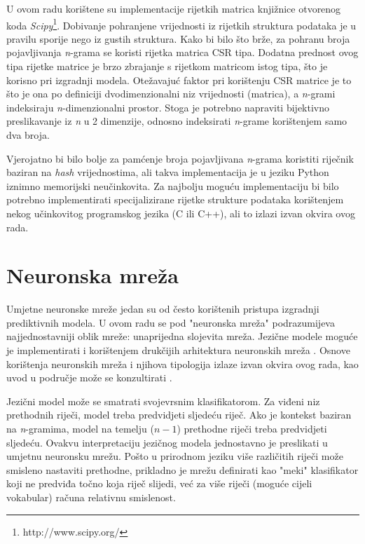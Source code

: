 \documentclass[times, utf8, diplomski, numeric]{fer}
\begin{document}
U ovom radu korištene su implementacije rijetkih matrica knjižnice otvorenog koda \textit{Scipy}\footnote{http://www.scipy.org/}. Dobivanje pohranjene vrijednosti iz rijetkih struktura podataka je u pravilu sporije nego iz gustih struktura. Kako bi bilo što brže, za pohranu broja pojavljivanja \textit{n}-grama se koristi rijetka matrica CSR  tipa. Dodatna prednost ovog tipa rijetke matrice je brzo zbrajanje s rijetkom matricom istog tipa, što je korisno pri izgradnji modela. Otežavajuć faktor pri korištenju CSR matrice je to što je ona po definiciji dvodimenzionalni niz vrijednosti (matrica), a \textit{n}-grami indeksiraju \textit{n}-dimenzionalni prostor. Stoga je potrebno napraviti bijektivno preslikavanje iz \textit{n} u 2 dimenzije, odnosno indeksirati \textit{n}-grame korištenjem samo dva broja.

Vjerojatno bi bilo bolje za pamćenje broja pojavljivana \textit{n}-grama koristiti riječnik baziran na \textit{hash} vrijednostima, ali takva implementacija je u jeziku Python iznimno memorijski neučinkovita. Za najbolju moguću implementaciju bi bilo potrebno implementirati specijalizirane rijetke strukture podataka korištenjem nekog učinkovitog programskog jezika (C ili C++), ali to izlazi izvan okvira ovog rada.

\chapter{Neuronska mreža}
\label{sec:nnet}

Umjetne neuronske mreže jedan su od često korištenih pristupa izgradnji prediktivnih modela. U ovom radu se pod "neuronska mreža" podrazumijeva najjednostavniji oblik mreže: unaprijedna slojevita mreža. Jezične modele moguće je implementirati i korištenjem drukčijih arhitektura neuronskih mreža \cite{mikolov2012statistical}. Osnove korištenja neuronskih mreža i njihova tipologija izlaze izvan okvira ovog rada, kao uvod u područje može se konzultirati \cite{cupic2013}.

Jezični model može se smatrati svojevrsnim klasifikatorom. Za viđeni niz prethodnih riječi, model treba predvidjeti sljedeću riječ. Ako je kontekst baziran na \textit{n}-gramima, model na temelju ($n - 1$) prethodne riječi treba predvidjeti sljedeću. Ovakvu interpretaciju jezičnog modela jednostavno je preslikati u umjetnu neuronsku mrežu. Pošto u prirodnom jeziku više različitih riječi može smisleno nastaviti prethodne, prikladno je mrežu definirati kao "meki" klasifikator koji ne predviđa točno koja riječ slijedi, već za više riječi (moguće cijeli vokabular) računa relativnu smislenost.
\end{document}

